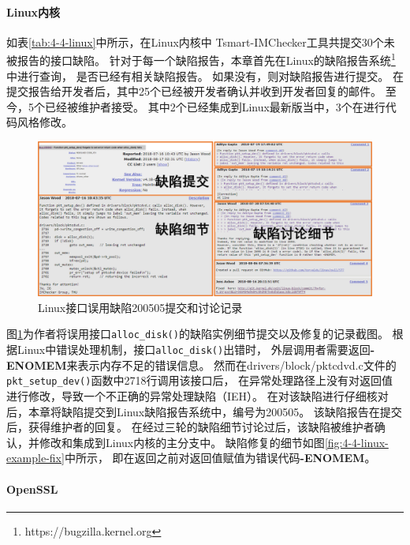 

\paragraph{Linux内核}
如表\ref{tab:4-4-linux}中所示，在Linux内核中
Tsmart-IMChecker工具共提交30个未被报告的接口缺陷。
针对于每一个缺陷报告，本章首先在Linux的缺陷报告系统\footnote{https://bugzilla.kernel.org}中进行查询，
是否已经有相关缺陷报告。
如果没有，则对缺陷报告进行提交。
在提交报告给开发者后，其中25个已经被开发者确认并收到开发者回复的邮件。
至今，5个已经被维护者接受。
其中2个已经集成到Linux最新版当中，3个在进行代码风格修改。

\begin{figure}[b]
	\centering
	\includegraphics[width=\linewidth]{figures/cp4-linux-example.png}
	\caption{
		Linux接口误用缺陷200505提交和讨论记录
	}
	\label{fig:4-4-linux-example}
\end{figure}




图\ref{fig:4-4-linux-example}为作者将误用接口\texttt{alloc\_disk()}的缺陷实例细节提交以及修复的记录截图。
根据Linux中错误处理机制，接口\texttt{alloc\_disk()}出错时，
外层调用者需要返回\textbf{-ENOMEM}来表示内存不足的错误信息。
然而在drivers/block/pktcdvd.c文件的\texttt{pkt\_setup\_dev()}函数中2718行调用该接口后，
在异常处理路径上没有对返回值进行修改，导致一个不正确的异常处理缺陷（IEH）。
在对该缺陷进行仔细核对后，本章将缺陷提交到Linux缺陷报告系统中，编号为200505。
该缺陷报告在提交后，获得维护者的回复。
在经过三轮的缺陷细节讨论过后，该缺陷被维护者确认，并修改和集成到Linux内核的主分支中。
缺陷修复的细节如图\ref{fig:4-4-linux-example-fix}中所示，
即在返回之前对返回值赋值为错误代码\textbf{-ENOMEM}。


\paragraph{OpenSSL}


